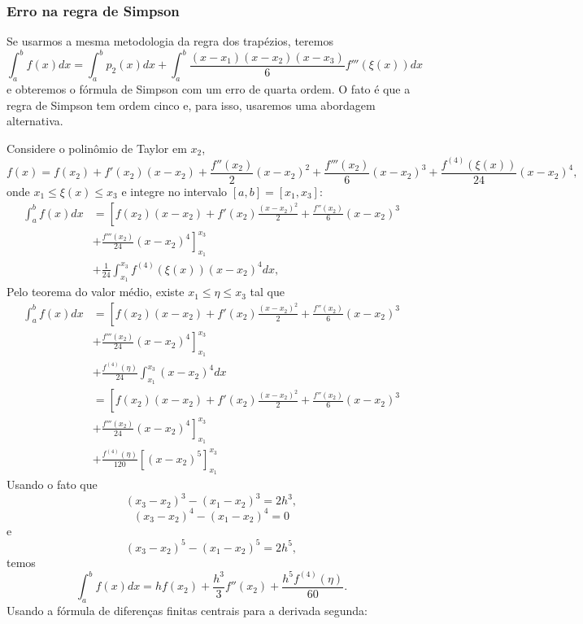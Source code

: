 \subsubsection{Erro na regra de Simpson}
Se usarmos a mesma metodologia da regra dos trapézios, teremos
$$
\int_a^bf(x)dx=\int_a^bp_2(x)dx+\int_a^b\frac{(x-x_1)(x-x_2)(x-x_3)}{6}f'''(\xi(x))dx
$$
e obteremos o fórmula de Simpson com um erro de quarta ordem. O fato é que a regra de Simpson tem ordem cinco e, para isso, usaremos uma abordagem alternativa.

Considere o polinômio de Taylor em $x_2$,
$$
f(x)=f(x_2)+f'(x_2)(x-x_2)+\frac{f''(x_2)}{2}(x-x_2)^2+\frac{f'''(x_2)}{6}(x-x_2)^3+\frac{f^{(4)}(\xi(x))}{24}(x-x_2)^4,
$$
onde $x_1\leq\xi(x)\leq x_3$ e integre no intervalo $[a,b]=[x_1,x_3]$:
\begin{equation*}
  \begin{split}
    \int_a^bf(x)dx&= \left[f(x_2)(x-x_2)+f'(x_2)\frac{(x-x_2)^2}{2} + \frac{f''(x_2)}{6}(x-x_2)^3\right. \\
      &\left. + \frac{f'''(x_2)}{24}(x-x_2)^4\right]_{x_1}^{x_3}\\
      &+ \frac{1}{24}\int_{x_1}^{x_3}f^{(4)}(\xi(x))(x-x_2)^4dx,    
  \end{split}
\end{equation*}
Pelo teorema do valor médio, existe $x_1\leq\eta\leq x_3$ tal que
\begin{equation*}
  \begin{split}
    \int_a^bf(x)dx&= \left[f(x_2)(x-x_2)+f'(x_2)\frac{(x-x_2)^2}{2}+\frac{f''(x_2)}{6}(x-x_2)^3\right.\\
    &+\left.\frac{f'''(x_2)}{24}(x-x_2)^4\right]_{x_1}^{x_3}\\
    &+ \frac{f^{(4)}(\eta)}{24}\int_{x_1}^{x_3}(x-x_2)^4dx\\
    &= \left[f(x_2)(x-x_2)+f'(x_2)\frac{(x-x_2)^2}{2}+\frac{f''(x_2)}{6}(x-x_2)^3\right.\\
    &+\left.\frac{f'''(x_2)}{24}(x-x_2)^4\right]_{x_1}^{x_3}\\
    &+ \frac{f^{(4)}(\eta)}{120}\left[(x-x_2)^5\right]_{x_1}^{x_3}    
  \end{split}
\end{equation*}
Usando o fato que
$$
(x_3-x_2)^3-(x_1-x_2)^3=2h^3,
$$
$$
(x_3-x_2)^4-(x_1-x_2)^4=0
$$
e
$$
(x_3-x_2)^5-(x_1-x_2)^5=2h^5,
$$
temos
$$
\int_a^bf(x)dx=hf(x_2)+\frac{h^3}{3}f''(x_2)+\frac{h^5f^{(4)}(\eta)}{60}.
$$
Usando a fórmula de diferenças finitas centrais para a derivada segunda:
